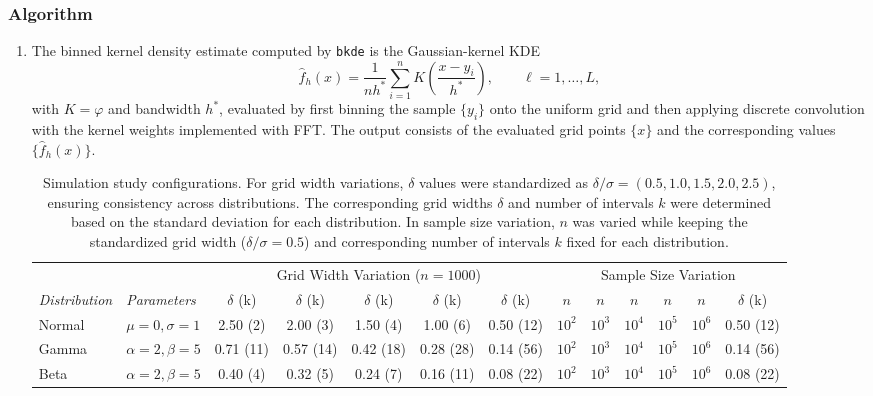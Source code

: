 \documentclass[12pt]{article} %
\begin{document}
\subsubsection*{Algorithm}
\begin{enumerate}
\item The binned kernel density estimate computed by \texttt{bkde} is the Gaussian-kernel KDE
\[
\hat f_h(x)
=\frac{1}{nh^*}\sum_{i=1}^n K\!\left(\frac{x-y_i}{h^*}\right),
\qquad \ell=1,\ldots,L,
\]
with $K=\varphi$ and bandwidth $h^*$, evaluated by first binning the sample $\{y_i\}$ onto the uniform grid and then applying discrete convolution with the kernel weights implemented with FFT. The output consists of the evaluated grid points $\{x\}$ and the corresponding values $\{\hat f_h(x)\}$.


\begin{table}
\centering
\caption{
Simulation study configurations. For grid width variations, $\delta$ values were standardized as $\delta / \sigma = (0.5, 1.0, 1.5, 2.0, 2.5)$, ensuring consistency across distributions. The corresponding grid widths $\delta$ and number of intervals $k$ were determined based on the standard deviation for each distribution. In sample size variation, $n$ was varied while keeping the standardized grid width ($\delta / \sigma = 0.5$) and corresponding number of intervals $k$ fixed for each distribution.
}
\renewcommand{\arraystretch}{1.5} %
\setlength{\tabcolsep}{6pt} %
\begin{tabular}{l l | ccccc | ccccc c}
    \toprule
    \multicolumn{2}{c|}{} & \multicolumn{5}{c|}{Grid Width Variation ($n = 1000$)} & \multicolumn{6}{c}{Sample Size Variation} \\ 
    \cmidrule(lr){1-7} \cmidrule(lr){8-13}
    \textit{Distribution} & \textit{Parameters} & $\delta$ (k) & $\delta$ (k) & $\delta$ (k) & $\delta$ (k) & $\delta$ (k) & $n$ & $n$ & $n$ & $n$ & $n$ & $\delta$ (k) \\ 
    \midrule
    Normal        & $\mu = 0, \sigma = 1$   & 2.50 (2) & 2.00 (3) & 1.50 (4) & 1.00 (6) & 0.50 (12) & $10^2$ & $10^3$ & $10^4$ & $10^5$ & $10^6$ & 0.50 (12) \\ 
    Gamma         & $\alpha = 2, \beta = 5$  & 0.71 (11) & 0.57 (14) & 0.42 (18) & 0.28 (28) & 0.14 (56) & $10^2$ & $10^3$ & $10^4$ & $10^5$ & $10^6$ & 0.14 (56) \\ 
    Beta          & $\alpha = 2, \beta = 5$  & 0.40 (4) & 0.32 (5) & 0.24 (7) & 0.16 (11) & 0.08 (22) & $10^2$ & $10^3$ & $10^4$ & $10^5$ & $10^6$ & 0.08 (22) \\ 

\end{tabular}
\end{table}
\end{enumerate}
\end{document}
